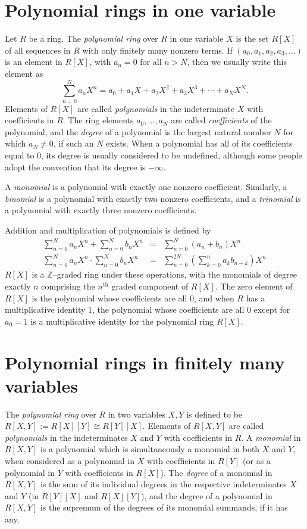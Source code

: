 \documentclass{article}
\begin{document}
\section{Polynomial rings in one variable}
Let $R$ be a ring. The \emph{polynomial ring} over $R$ in one variable $X$ is the set $R[X]$ of all sequences in $R$ with only finitely many nonzero terms. If $(a_0, a_1, a_2, a_3, \dots)$ is an element in $R[X]$, with $a_n = 0$ for all $n > N$, then we usually write this element as
$$
\sum_{n=0}^N a_n X^n = a_0 + a_1 X + a_2 X^2 + a_3 X^3 + \cdots + a_N X^N.
$$
Elements of $R[X]$ are called \emph{polynomials} in the indeterminate $X$ with coefficients in $R$. The ring elements $a_0, \ldots, a_N$ are called \emph{coefficients} of the polynomial, and the \emph{degree} of a polynomial is the largest natural number $N$ for which $a_N \neq 0$, if such an $N$ exists. When a polynomial has all of its coefficients equal to $0$, its degree is usually considered to be undefined, although some people adopt the convention that its degree is $-\infty$.

A \emph{monomial} is a polynomial with exactly one nonzero coefficient. Similarly, a \emph{binomial} is a polynomial with exactly two nonzero coefficients, and a \emph{trinomial} is a polynomial with exactly three nonzero coefficients.

Addition and multiplication of polynomials is defined by
\begin{eqnarray}
\sum_{n=0}^N a_n X^n + \sum_{n=0}^N b_n X^n & = & \sum_{n=0}^N (a_n+b_n) X^n \\
\sum_{n=0}^N a_n X^n \cdot \sum_{n=0}^N b_n X^n & = & \sum_{n=0}^{2N} \left(\sum_{k=0}^n a_k b_{n-k}\right) X^n
\end{eqnarray}
$R[X]$ is a $\mathbb{Z}$--graded ring under these operations, with the monomials of degree exactly $n$ comprising the $n^\mathrm{th}$ graded component of $R[X]$. The zero element of $R[X]$ is the polynomial whose coefficients are all $0$, and when $R$ has a multiplicative identity $1$, the polynomial whose coefficients are all $0$ except for $a_0 = 1$ is a multiplicative identity for the polynomial ring $R[X]$.

\section{Polynomial rings in finitely many variables}

The \emph{polynomial ring} over $R$ in two variables $X,Y$ is defined to be $R[X,Y] := R[X][Y] \cong R[Y][X]$. Elements of $R[X,Y]$ are called \emph{polynomials} in the indeterminates $X$ and $Y$ with coefficients in $R$. A \emph{monomial} in $R[X,Y]$ is a polynomial which is simultaneously a monomial in both $X$ and $Y$, when considered as a polynomial in $X$ with coefficients in $R[Y]$ (or as a polynomial in $Y$ with coefficients in $R[X]$). The \emph{degree} of a monomial in $R[X,Y]$ is the sum of its individual degrees in the respective indeterminates $X$ and $Y$ (in $R[Y][X]$ and $R[X][Y]$), and the degree of a polynomial in $R[X,Y]$ is the supremum of the degrees of its monomial summands, if it has any.
\end{document}
